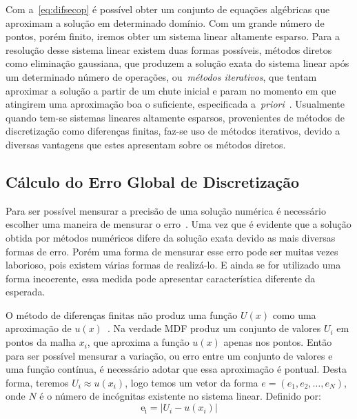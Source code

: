 \documentclass[
	12pt,				  %
	openright,		%
	twoside,			%
	a4paper,			%
	chapter=TITLE,		    %
	english,			%
	brazil				%
	]{abntex2}
\begin{document}
Com a~\autoref{eq:difsecop} é possível obter um conjunto de equações algébricas
que aproximam a solução em determinado domínio. Com um grande número de pontos,
porém finito, iremos obter um sistema linear altamente esparso. Para a
resolução desse sistema linear existem duas formas possíveis, métodos diretos
como eliminação gaussiana, que produzem a solução exata do sistema linear após
um determinado número de operações, ou~\textit{métodos iterativos}, que tentam
aproximar a solução a partir de um chute inicial e param no momento em que
atingirem uma aproximação boa o suficiente, especificada
a~\textit{priori}~\cite{leveque2007}. Usualmente quando tem-se sistemas
lineares altamente esparsos, provenientes de métodos de discretização como
diferenças finitas, faz-se uso de métodos iterativos, devido a diversas
vantagens que estes apresentam sobre os métodos diretos.

\subsection{Cálculo do Erro Global de Discretização}\label{sec:ErroGlobal}

Para ser possível mensurar a precisão de uma solução numérica é necessário
escolher uma maneira de mensurar o erro~\cite{leveque2007}. Uma vez que é
evidente que a solução obtida por métodos numéricos difere da solução exata
devido as mais diversas formas de erro. Porém uma forma de mensurar esse erro
pode ser muitas vezes laborioso, pois existem várias formas de realizá-lo.
E ainda se for utilizado uma forma incoerente, essa medida pode apresentar
característica diferente da esperada. 


O método de diferenças finitas não produz uma função $U(x)$ como uma
aproximação de $u(x)$~\cite{leveque2007}. Na verdade MDF produz um conjunto de
valores $U_i$ em pontos da malha $x_i$, que aproxima a função $u(x)$ apenas nos
pontos. Então para ser possível mensurar a variação, ou erro entre um
conjunto de valores e uma função contínua, é necessário adotar que essa
aproximação é pontual. Desta forma, teremos $U_i \approx u(x_i)$, logo temos
um vetor da forma $e = (e_1, e_2, \ldots, e_N)$, onde $N$ é o número de
incógnitas existente no sistema linear. Definido por:
\begin{equation}
    \mathrm{e_i} = |U_i - u(x_i)|
    \label{eq:errorvector}
\end{equation}
\end{document}
